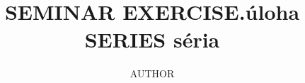 \documentclass[]{article}
\title{SEMINAR EXERCISE.úloha SERIES séria}
\author{AUTHOR}
\begin{document}
\maketitle

\begin{abstract}

\end{abstract}

\section{}
\end{document}
